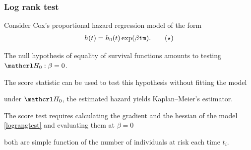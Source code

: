 \documentclass{beamer}
\begin{document}
\begin{frame}[fragile]
\frametitle{Log rank test}
 Consider Cox's proportional hazard regression model of the form
 \begin{align} 
  h(t) = h_0(t)\exp(\beta \texttt{im}). \tag{$\star$} \label{lograngtest}
 \end{align}
\bi 
\item The null hypothesis of equality of survival functions amounts to testing $\Hy_0: \beta=0$. 
\item The score statistic can be used to test this hypothesis without fitting the model 
\bi 
\item under $\Hy_0$, the estimated hazard yields Kaplan--Meier's estimator.
\ei
\item The score test requires calculating the gradient and the hessian of the model \eqref{lograngtest} and evaluating them at $\beta=0$ 
\bi 
\item both are simple function of the number of individuals at risk each time $t_i$. 
\ei
 \ei
\end{frame}
% 
%  
\end{document}
